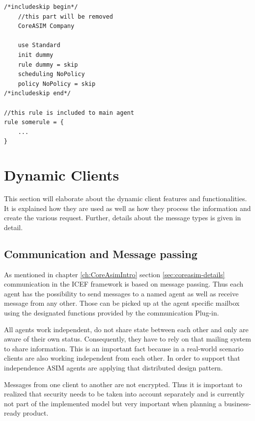 \begin{center}
\begin{minipage}{0.8\textwidth}
\begin{lstlisting}[language=bsl_lst,caption={\bf\small includeskip usage},label=lst:includeskip]
/*includeskip begin*/
	//this part will be removed
	CoreASIM Company

	use Standard 
	init dummy
	rule dummy = skip
	scheduling NoPolicy
	policy NoPolicy = skip
/*includeskip end*/

//this rule is included to main agent
rule somerule = {
	...
}
\end{lstlisting}
\end{minipage}
\end{center}

\section{Dynamic Clients}
\label{sec:impl-dyn-clients}

This section will elaborate about the dynamic client features and functionalities. It is explained how they are used as well as how they process the information and create the various request. Further, details about the message types is given in detail.

\subsection{Communication and Message passing}
\label{sec:impl-com-msg}

As mentioned in chapter \ref{ch:CoreAsimIntro} section \ref{sec:coreasim-details} communication in the ICEF framework is based on message passing. Thus each agent has the possibility to send messages to a named agent as well as receive message from any other. Those can be picked up at the agent specific mailbox using the designated functions provided by the communication Plug-in.

All agents work independent, do not share state between each other and only are aware of their own status. Consequently, they have to rely on that mailing system to share information. This is an important fact because in a real-world scenario clients are also working independent from each other. In order to support that independence ASIM agents are applying that distributed design pattern.

Messages from one client to another are not encrypted. Thus it is important to realized that security needs to be taken into account separately and is currently not part of the implemented model but very important when planning a business-ready product.

